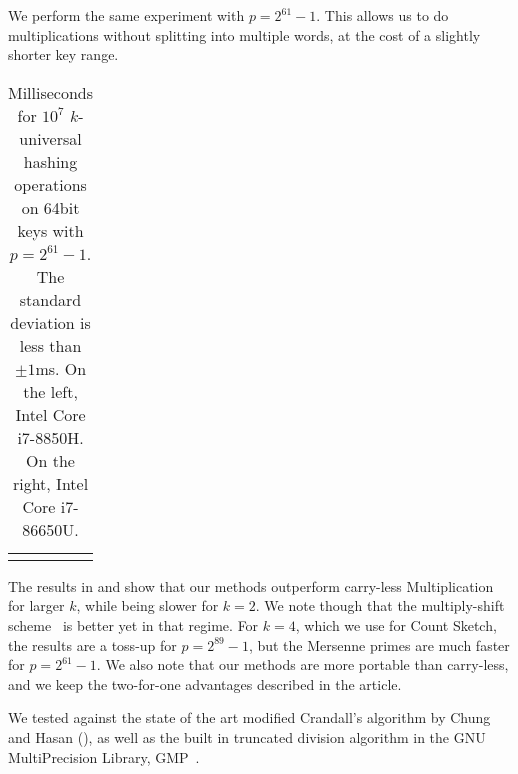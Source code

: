 We perform the same experiment with $p=2^{61}-1$.
This allows us to do multiplications without splitting into multiple words, at the cost of a slightly shorter key range.

\begin{table}[H]
   \centering
   \begin{tabular}{c c}
      \hspace{.5em}
      &
      \hspace{.5em}
   \end{tabular}
   \caption{Milliseconds for $10^7$ $k$-universal hashing operations on 64bit keys with $p=2^{61}-1$.
      The standard deviation is less than $\pm1$ms.
         On the left, Intel Core i7-8850H.
         On the right, Intel Core i7-86650U.
   }
   \label{tab:hashing-experiments2}
\end{table}

The results in  and  show that our methods outperform carry-less Multiplication for larger $k$, while being slower for $k=2$.
We note though that the multiply-shift scheme~\cite{dietzfel96universal} is better yet in that regime.
For $k=4$, which we use for Count Sketch, the results are a toss-up for $p=2^{89}-1$, but the Mersenne primes are much faster for $p=2^{61}-1$.
We also note that our methods are more portable than carry-less, and we keep the two-for-one advantages described in the article.
\vspace{.5em} %

We tested  against the state of the art modified Crandall's algorithm by Chung and Hasan (), as well as the built in truncated division algorithm in the GNU MultiPrecision Library, GMP~\cite{granlund2010gnu}.

